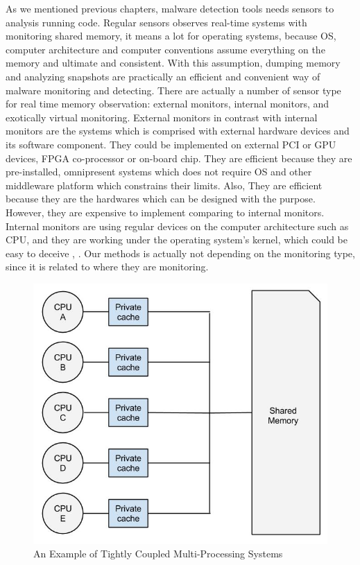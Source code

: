 As we mentioned previous chapters, malware detection tools needs sensors to analysis running code. Regular sensors observes real-time systems with monitoring shared memory, it means a lot for operating systems, because OS, computer architecture and computer conventions assume everything on the memory and ultimate and consistent. With this assumption, dumping memory and analyzing snapshots are practically an efficient and convenient way of malware monitoring and detecting. There are actually a number of sensor type for real time memory observation: external monitors, internal monitors, and exotically virtual monitoring. External monitors in contrast with internal monitors are the systems which is comprised with external hardware devices and its software component. They could be implemented on external PCI or GPU devices, FPGA co-processor or on-board chip\cite{Christos2013}. They are efficient because they are pre-installed, omnipresent systems which does not require OS and other middleware platform which constrains their limits. Also, They are efficient because they are the hardwares which can be designed with the purpose. However, they are expensive to implement comparing to internal monitors. Internal monitors are using regular devices on the computer architecture such as CPU, and they are working under the operating system's kernel, which could be easy to deceive \cite{Adnan2011}, \cite{rutkowska2006rootkits}. Our methods is actually not depending on the monitoring type, since it is related to where they are monitoring.
    \begin{figure}[h!]
        \centering
        \includegraphics[width=1\textwidth]{img/Tightly Coupled Multi-Processing Systems.jpg}
        \caption{An Example of Tightly Coupled Multi-Processing Systems}
        \label{fig:tightlycoupled}
    \end{figure}
